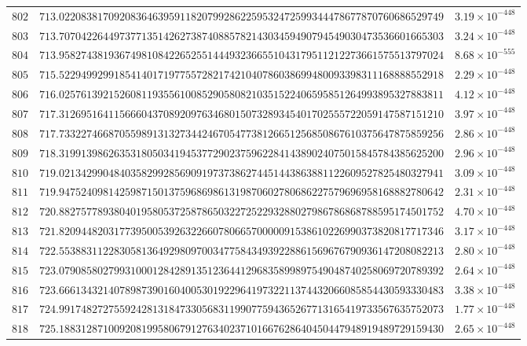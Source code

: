 \documentclass[12pt,reqno]{amsart}
\theoremstyle{remark}
\begin{document}
\begin{longtable}{clc}
$802$ & $713.0220838170920836463959118207992862259532472599344478677870760686529749$ & $3.19\times 10^{-448}$ \\
$803$ & $713.7070422644973771351426273874088578214303459490794549030473536601665303$ & $3.24\times 10^{-448}$ \\
$804$ & $713.9582743819367498108422652551444932366551043179511212273661575513797024$ & $8.68\times 10^{-555}$ \\
$805$ & $715.5229499299185414017197755728217421040786038699480093398311168888552918$ & $2.29\times 10^{-448}$ \\
$806$ & $716.0257613921526081193556100852905808210351522406595851264993895327883811$ & $4.12\times 10^{-448}$ \\
$807$ & $717.3126951641156660437089209763468015073289345401702555722059147587151210$ & $3.97\times 10^{-448}$ \\
$808$ & $717.7332274668705598913132734424670547738126651256850867610375647875859256$ & $2.86\times 10^{-448}$ \\
$809$ & $718.3199139862635318050341945377290237596228414389024075015845784385625200$ & $2.96\times 10^{-448}$ \\
$810$ & $719.0213429904840358299285690919737386274451443863881122609527825480327941$ & $3.09\times 10^{-448}$ \\
$811$ & $719.9475240981425987150137596869861319870602780686227579696958168882780642$ & $2.31\times 10^{-448}$ \\
$812$ & $720.8827577893804019580537258786503227252293288027986786868788595174501752$ & $4.70\times 10^{-448}$ \\
$813$ & $721.8209448203177395005392632266078066570000091538610226990373820817717346$ & $3.17\times 10^{-448}$ \\
$814$ & $722.5538831122830581364929809700347758434939228861569676790936147208082213$ & $2.80\times 10^{-448}$ \\
$815$ & $723.0790858027993100012842891351236441296835899897549048740258069720789392$ & $2.64\times 10^{-448}$ \\
$816$ & $723.6661343214078987390160400530192296419732211374432066085854430593330483$ & $3.38\times 10^{-448}$ \\
$817$ & $724.9917482727559242813184733056831199077594365267713165419733567635752073$ & $1.77\times 10^{-448}$ \\
$818$ & $725.1883128710092081995806791276340237101667628640450447948919489729159430$ & $2.65\times 10^{-448}$ \\

\end{longtable}
\end{document}
